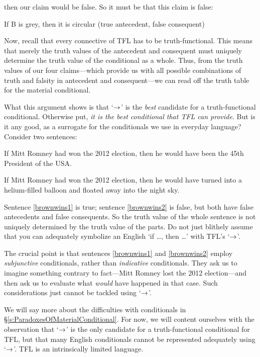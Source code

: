 then our claim would be false. So it must be that this claim is false:
	\begin{ebullet}
		\item If B is grey, then it is circular \hfill (true antecedent, false consequent)
	\end{ebullet}
Now, recall that every connective of TFL has to be truth-functional. This means that merely the truth values of the antecedent and consequent must uniquely determine the truth value of the conditional as a whole. Thus, from the truth values of our four claims---which provide us with all possible combinations of truth and falsity in antecedent and consequent---we can read off the truth table for the material conditional.

What this argument shows is that `$\rightarrow$' is the \emph{best} candidate for a truth-functional conditional. Otherwise put, \emph{it is the best conditional that TFL can provide}. But is it any good, as a surrogate for the conditionals we use in everyday language? Consider two sentences:
	\begin{earg}
		\item[\ex{brownwins1}] If Mitt Romney had won the 2012 election, then he would have been the 45th President of the USA.
		\item[\ex{brownwins2}] If Mitt Romney had won the 2012 election, then he would have turned into a helium-filled balloon and floated away into the night sky.
	\end{earg}
Sentence \ref{brownwins1} is true; sentence \ref{brownwins2} is false, but both have false antecedents and false consequents. So the truth value of the whole sentence is not uniquely determined by the truth value of the parts. Do not just blithely assume that you can adequately symbolize an English `if \dots, then \dots' with TFL's `$\rightarrow$'. 

The crucial point is that sentences \ref{brownwins1} and \ref{brownwins2} employ \emph{subjunctive} conditionals, rather than \emph{indicative} conditionals. They ask us to imagine something contrary to fact---Mitt Romney lost the 2012 election---and then ask us to evaluate what \emph{would} have happened in that case. Such considerations just cannot be tackled using `$\rightarrow$'.

We will say more about the difficulties with conditionals in \S\ref{s:ParadoxesOfMaterialConditional}. For now, we will content ourselves with the observation that `$\rightarrow$' is the only candidate for a truth-functional conditional for TFL, but that many English conditionals cannot be represented adequately using `$\rightarrow$'. TFL is an intrinsically limited language. 


